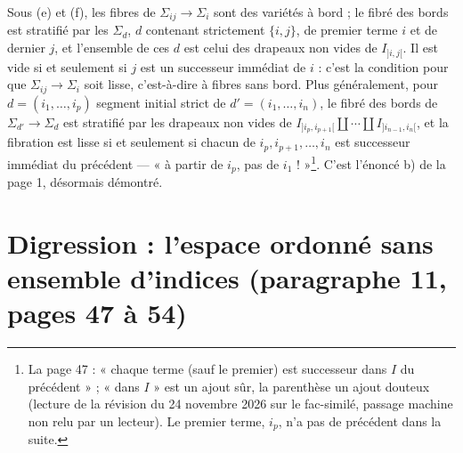 \documentclass[11pt,a4paper]{article}
\begin{document}
Sous (e) et (f), les fibres de $\Sigma_{ij} \to \Sigma_i$ sont des variétés à bord ;
le fibré des bords est stratifié par les $\Sigma_d$, $d$ contenant strictement
$\{i,j\}$, de premier terme $i$ et de dernier $j$, et l'ensemble de ces $d$ est
celui des drapeaux non vides de $I_{]i,j[}$. Il est vide si et seulement si $j$ est un
successeur immédiat de $i$ : c'est la condition pour que $\Sigma_{ij} \to \Sigma_i$
soit lisse, c'est-à-dire à fibres sans bord. Plus généralement, pour $d =
(i_1, …, i_p)$ segment initial strict de $d' = (i_1, …, i_n)$, le fibré des
bords de $\Sigma_{d'} \to \Sigma_d$ est stratifié par les drapeaux non vides de
$I_{]i_p, i_{p+1}[} \amalg \cdots \amalg I_{]i_{n-1}, i_n[}$, et la fibration est
lisse si et seulement si chacun de $i_p, i_{p+1}, …, i_n$ est successeur
immédiat du précédent — « à partir de $i_p$, pas de $i_1$ ! »\footnote{La page 47 : « chaque terme (sauf le premier) est successeur dans $I$ du précédent » ; « dans $I$ » est un ajout sûr, la parenthèse un ajout douteux (lecture de la révision du 24 novembre 2026 sur le fac-similé, passage machine non relu par un lecteur). Le premier terme, $i_p$, n'a pas de précédent dans la suite.}. C'est l'énoncé b) de
la page 1, désormais démontré.

\section*{Digression : l'espace ordonné sans ensemble d'indices (paragraphe 11, pages 47 à 54)}
\end{document}
